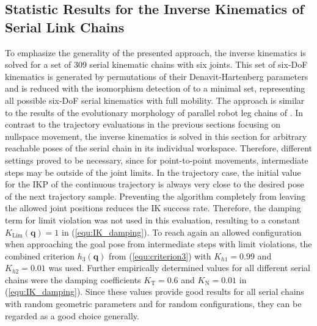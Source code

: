 \documentclass[robotics,article,submit,moreauthors,pdftex]{Definitions/mdpi}
\newcommand{\bm}[1]{\boldsymbol{#1}}
\begin{document}
\subsection{Statistic Results for the Inverse Kinematics of Serial Link Chains}
\label{sec:Ergebnisse_IK_Statistik}

To emphasize the generality of the presented approach, the inverse kinematics is solved for a set of 309 serial kinematic chains with six joints.
This set of six-DoF kinematics is generated by permutations of their Denavit-Hartenberg parameters and is reduced with the isomorphism detection of \cite{RamirezKotOrt2015} to a minimal set, representing all possible six-DoF serial kinematics with full mobility.
The approach is similar to the results of the evolutionary morphology of parallel robot leg chains of \cite{Gogu2008}.
In contrast to the trajectory evaluations in the previous sections focusing on nullspace movement, the inverse kinematics is solved in this section for arbitrary reachable poses of the serial chain in its individual workspace.
Therefore, different settings proved to be necessary, since for point-to-point movements, intermediate steps may be outside of the joint limits.
In the trajectory case, the initial value for the IKP of the continuous trajectory is always very close to the desired pose of the next trajectory sample.
Preventing the algorithm completely from leaving the allowed joint positions reduces the IK success rate.
Therefore, the damping term for limit violation was not used in this evaluation, resulting to a constant $K_\mathrm{Lim}(\bm{q})=1$ in (\ref{equ:IK_damping}).
To reach again an allowed configuration when approaching the goal pose from intermediate steps with limit violations, the combined criterion $h_3(\bm{q})$ from (\ref{equ:criterion3}) with $K_{h1}=0.99$ and $K_{h2}=0.01$ was used.
Further empirically determined values for all different serial chains were the damping coefficients $K_{\mathrm{T}}=0.6$ and $K_{\mathrm{N}}=0.01$ in (\ref{equ:IK_damping}).
Since these values provide good results for all serial chains with random geometric parameters and for random configurations, they can be regarded as a good choice generally.
\end{document}
